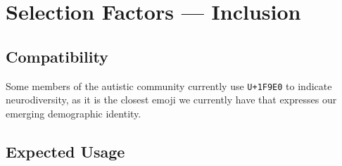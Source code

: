 \section{Selection Factors --- Inclusion}

\subsection{Compatibility}
Some members of the autistic community currently use \texttt{U+1F9E0} to indicate neurodiversity, as it is the closest emoji we currently have that expresses our emerging demographic identity.

\subsection{Expected Usage}
